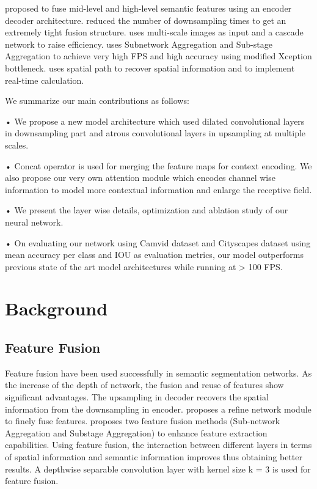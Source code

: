 \documentclass{article}
\begin{document}
\citep{lin2017refinenet} proposed to fuse mid-level and high-level semantic features using an encoder decoder architecture. \citep{paszke2016enet} reduced the number of downsampling times to get an extremely tight fusion structure. \citep{zhao2018icnet} uses multi-scale images as input and a cascade network to raise efficiency. \citep{li2019dfanet}  uses Subnetwork Aggregation and Sub-stage Aggregation to achieve very high FPS and high accuracy using modified Xception bottleneck. \citep{yu2018bisenet} uses spatial path to recover spatial information and to implement real-time calculation.

We summarize our main contributions as follows:

• We propose a new model architecture which used dilated convolutional layers in downsampling part and atrous convolutional layers in upsampling at multiple scales.  

• Concat operator is used for merging the feature maps for context encoding. We also propose our very own attention module which encodes channel wise information to model more contextual information and enlarge the receptive field.

• We present the layer wise details, optimization and ablation study of our neural network.

• On evaluating our network using Camvid dataset and Cityscapes dataset using mean accuracy per class and IOU as evaluation metrics, our model outperforms previous state of the art model architectures while running at > 100 FPS.

\section{Background}

\subsection{Feature Fusion}

Feature fusion have been used successfully in semantic segmentation networks. As the increase of the depth of network, the fusion and reuse of features show significant advantages. The upsampling in decoder recovers the spatial information from the downsampling in encoder. \citep{lin2017refinenet} proposes a refine network module to finely fuse features. \citep{li2019dfanet} proposes two feature fusion methods (Sub-network Aggregation and Substage Aggregation) to enhance feature extraction capabilities. Using feature fusion, the interaction between different layers in terms of spatial information and semantic information improves thus obtaining better results. A depthwise separable convolution layer with kernel size k = 3 is used for feature fusion. 
\end{document}
